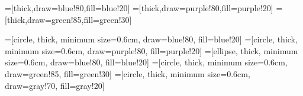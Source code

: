 \usepackage[english]{babel}

\usepackage[latin1]{inputenc}


\usepackage{times}
\usepackage{colortbl}
\usepackage[T1]{fontenc}

\usepackage{graphicx,fancybox}
\usepackage{tabularx}
\usepackage{algorithmic}
\usepackage{tikz}
\usetikzlibrary{shapes,snakes,matrix,arrows,decorations,shadows,plotmarks,calc}



\makeatletter
{}
\makeatother

\usenavigationsymbolstemplate{}

\usepackage{babel}

=[thick,draw=blue!80,fill=blue!20]
=[thick,draw=purple!80,fill=purple!20]
=[thick,draw=green!85,fill=green!30]

=[circle,
                   thick,
                   minimum size=0.6cm,
                   draw=blue!80,
                   fill=blue!20]
=[circle,
                    thick,
                    minimum size=0.6cm,
                    draw=purple!80,
                    fill=purple!20]
=[ellipse,
                    thick,
                    minimum size=0.6cm,
                    draw=blue!80,
                    fill=blue!20]
=[circle,
                      thick,
                      minimum size=0.6cm,
                      draw=green!85,
                      fill=green!30]
=[circle,
                      thick,
                      minimum size=0.6cm,
                      draw=gray!70,
                      fill=gray!20]


